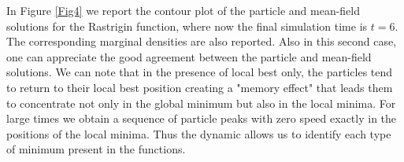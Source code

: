 \documentclass{ims9x6}
\begin{document}
\noindent In Figure \ref{Fig4} we report the contour plot of the particle and mean-field solutions for the Rastrigin function, where now the final simulation time is $t=6$. The corresponding marginal densities are also reported.
Also in this second case, one can appreciate the good agreement between the particle and mean-field solutions.
We can note that in the presence of local best only, the particles tend to return to their local best position creating a "memory effect" that leads them to concentrate not only in the global minimum but also in the local minima. For large times we obtain a sequence of particle peaks with zero speed exactly in the positions of the local minima. Thus the dynamic allows us to identify each type of minimum present in the functions. 
\end{document}
